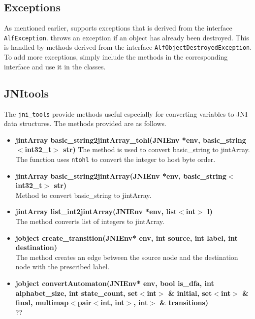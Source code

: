 \subsection*{Exceptions}
As mentioned earlier, \jalf supports exceptions that is derived from the interface \texttt{AlfException}. \jalf throws an exception if an object has already been destroyed. This is handled by methods derived from the interface \texttt{AlfObjectDestroyedException}. To add more exceptions, simply include the methods in the corresponding interface and use it in the classes. 
   
\subsection*{JNItools}
The \texttt{jni\_tools} provide methods useful especially for converting variables to JNI data structures. The methods provided are as follows.
\begin{itemize}
 \item \textbf{jintArray basic\_string2jintArray\_tohl(JNIEnv *env, basic\_string$<$int32\_t$>$ str)}
	The method is used to convert basic\_string to jintArray. The function uses \texttt{ntohl} to convert the integer to host byte order. 
 \item \textbf{jintArray basic\_string2jintArray(JNIEnv *env, basic\_string$<$int32\_t$>$ str)} \\ 
	Method to convert basic\_string to jintArray.
 \item \textbf{jintArray list\_int2jintArray(JNIEnv *env, list$<$int$>$ l)} \\
	The method converts list of integers to jintArray.
 \item \textbf{jobject create\_transition(JNIEnv* env, int source, int label, int destination)} \\
	The method creates an edge between the source node and the destination node with the prescribed label.
 \item \textbf{jobject convertAutomaton(JNIEnv* env, bool is\_dfa, int alphabet\_size, int state\_count, set$<$int$>$ \& initial, set$<$int$>$ \& final, multimap$<$pair$<$int, int$>$, int$>$ \& transitions)}\\ ??

\end{itemize}


